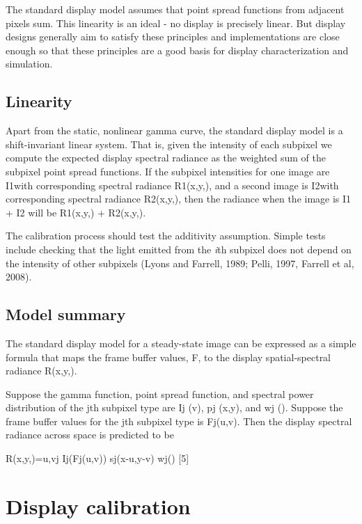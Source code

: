 \documentclass[
  letterpaper,
]{book}
\begin{document}
The standard display model assumes that point spread functions from
adjacent pixels sum. This linearity is an ideal - no display is
precisely linear. But display designs generally aim to satisfy these
principles and implementations are close enough so that these principles
are a good basis for display characterization and simulation.

\subsection{\texorpdfstring{\textbf{Linearity}}{Linearity}}\label{linearity-1}

Apart from the static, nonlinear gamma curve, the standard display model
is a shift-invariant linear system. That is, given the intensity of each
subpixel we compute the expected display spectral radiance as the
weighted sum of the subpixel point spread functions. If the subpixel
intensities for one image are I1with corresponding spectral radiance
R1(x,y,), and a second image is I2with corresponding spectral radiance
R2(x,y,), then the radiance when the image is I1 + I2 will be R1(x,y,) +
R2(x,y,).

The calibration process should test the additivity assumption. Simple
tests include checking that the light emitted from the \emph{i}th
subpixel does not depend on the intensity of other subpixels (Lyons and
Farrell, 1989; Pelli, 1997, Farrell et al, 2008).

\subsection{Model summary}\label{model-summary}

The standard display model for a steady-state image can be expressed as
a simple formula that maps the frame buffer values, F, to the display
spatial-spectral radiance R(x,y,).

Suppose the gamma function, point spread function, and spectral power
distribution of the jth subpixel type are Ij (v), pj (x,y), and wj ().
Suppose the frame buffer values for the jth subpixel type is Fj(u,v).
Then the display spectral radiance across space is predicted to be

R(x,y,)=u,vj Ij(Fj(u,v)) sj(x-u,y-v) wj() {[}5{]}

\section{Display calibration}\label{display-calibration}
\end{document}
